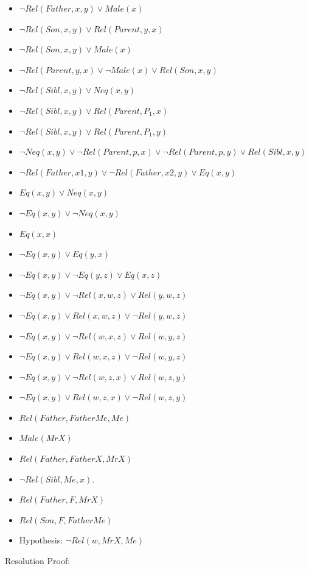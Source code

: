 \documentclass[10pt]{article}
\begin{document}
\begin{enumerate}
\begin{itemize}
  \item $\neg Rel(Father,x,y) \lor Male(x)$
  \item $\neg Rel(Son,x,y) \lor Rel(Parent,y,x)$
  \item $\neg Rel(Son,x,y) \lor Male(x)$
  \item $\neg Rel(Parent,y,x) \lor \neg Male(x) \lor Rel(Son,x,y)$
  \item $\neg Rel(Sibl,x,y) \lor Neq(x,y)$
  \item $\neg Rel(Sibl,x,y) \lor Rel(Parent,P_1,x)$
  \item $\neg Rel(Sibl,x,y) \lor Rel(Parent,P_1,y)$
  \item $\neg Neq(x,y) \lor \neg Rel(Parent,p,x) \lor 
         \neg Rel(Parent,p,y) \lor Rel(Sibl,x,y)$
  \item $\neg Rel(Father,x1,y) \lor \neg Rel(Father,x2,y) \lor Eq(x,y)$
  \item $Eq(x,y) \lor Neq(x,y)$
  \item $\neg Eq(x,y) \lor \neg Neq(x,y)$
  \item $Eq(x,x)$
  \item $\neg Eq(x,y) \lor Eq(y,x)$
  \item $\neg Eq(x,y) \lor \neg Eq(y,z) \lor Eq(x,z)$
  \item $\neg Eq(x,y) \lor \neg Rel(x,w,z) \lor Rel(y,w,z)$
  \item $\neg Eq(x,y) \lor Rel(x,w,z) \lor \neg Rel(y,w,z)$
  \item $\neg Eq(x,y) \lor \neg Rel(w,x,z) \lor Rel(w,y,z)$
  \item $\neg Eq(x,y) \lor Rel(w,x,z) \lor \neg Rel(w,y,z)$
  \item $\neg Eq(x,y) \lor \neg Rel(w,z,x) \lor Rel(w,z,y)$
  \item $\neg Eq(x,y) \lor Rel(w,z,x) \lor \neg Rel(w,z,y)$
  \item $Rel(Father, FatherMe, Me)$
  \item $Male(MrX)$
  \item $Rel(Father, FatherX, MrX)$
  \item $\neg Rel(Sibl,Me,x)$.
  \item $Rel(Father,F,MrX)$
  \item $Rel(Son,F,FatherMe)$
  \item Hypothesis: $\neg Rel(w, MrX, Me)$
  \end{itemize}
  Resolution Proof:
  \ \\

\end{enumerate}
\end{document}
